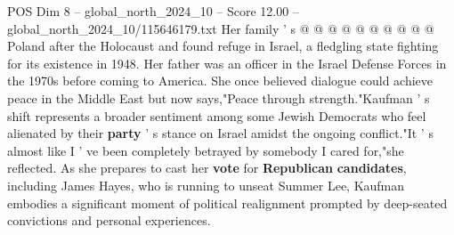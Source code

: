 \begin{textsample}{POS Dim 8 – global\_north\_2024\_10 – Score 12.00 – global\_north\_2024\_10/115646179.txt}
Her family ' s @ @ @ @ @ @ @ @ @ @ Poland after the Holocaust and found refuge in Israel, a fledgling state fighting for its existence in 1948.
Her father was an officer in the Israel Defense Forces in the 1970s before coming to America.
She once believed dialogue could achieve peace in the Middle East but now says,"Peace through strength."Kaufman ' s shift represents a broader sentiment among some Jewish Democrats who feel alienated by their \textbf{party} ' s stance on Israel amidst the ongoing conflict."It ' s almost like I ' ve been completely betrayed by somebody I cared for,"she reflected.
As she prepares to cast her \textbf{vote} for \textbf{Republican} \textbf{candidates}, including James Hayes, who is running to unseat Summer Lee, Kaufman embodies a significant moment of political realignment prompted by deep-seated convictions and personal experiences.

\end{textsample}
